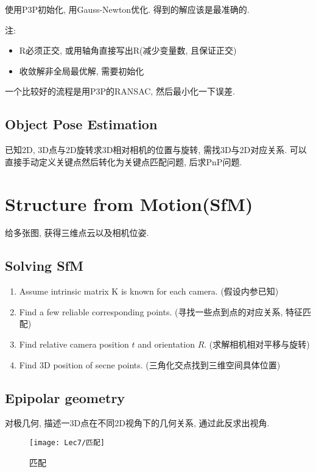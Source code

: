 使用P3P初始化, 用Gauss-Newton优化. 得到的解应该是最准确的. 

注: 
\begin{itemize}
    \item R必须正交, 或用轴角直接写出R(减少变量数, 且保证正交)
    \item 收敛解非全局最优解, 需要初始化
\end{itemize}

一个比较好的流程是用P3P的RANSAC, 然后最小化一下误差. 

\subsection{Object Pose Estimation}
已知2D, 3D点与2D旋转求3D相对相机的位置与旋转, 需找3D与2D对应关系. 可以直接手动定义关键点然后转化为关键点匹配问题, 后求PnP问题. 

\section{Structure from Motion(SfM)}
给多张图, 获得三维点云以及相机位姿. 

\subsection{Solving SfM}
\begin{enumerate}
    \item Assume intrinsic matrix K is known for each camera. (假设内参已知)
    \item Find a few reliable corresponding points. (寻找一些点到点的对应关系, 特征匹配)
    \item Find relative camera position $t$ and orientation $R$. (求解相机相对平移与旋转)
    \item Find 3D position of secne points. (三角化交点找到三维空间具体位置)
\end{enumerate}

\subsection{Epipolar geometry}
对极几何, 描述一3D点在不同2D视角下的几何关系, 通过此反求出视角. 
\begin{figure}[H]
    \centering
    \texttt{[image: Lec7/匹配]}
    \caption{匹配}
\end{figure}

